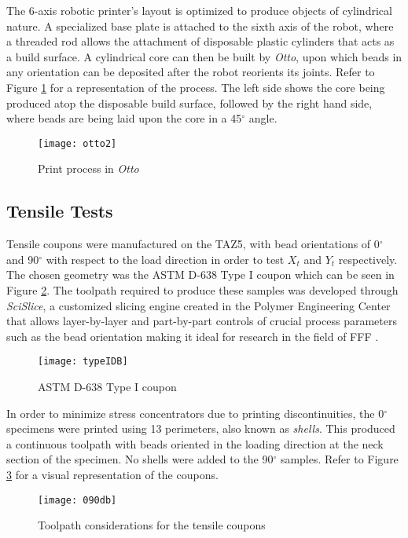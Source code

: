 \documentclass[main.tex]{subfiles}
\begin{document}
The 6-axis robotic printer's layout is optimized to produce objects of cylindrical nature. A specialized base plate is attached to the sixth axis of the robot, where a threaded rod allows the attachment of disposable plastic cylinders that acts as a build surface. A cylindrical core can then be built by \emph{Otto}, upon which beads in any orientation can be deposited after the robot reorients its joints. Refer to Figure \ref{fig:otto2} for a representation of the process. The left side shows the core being produced atop the disposable build surface, followed by the right hand side, where beads are being laid upon the core in a 45$^\circ$ angle.  
\begin{figure}[h]
	\center
	\texttt{[image: otto2]}
	\caption{Print process in \emph{Otto}} \label{fig:otto2}
\end{figure}

\subsection{Tensile Tests}
Tensile coupons were manufactured on the TAZ5, with bead orientations of 0$^\circ$ and 90$^\circ$ with respect to the load direction in order to test $X_t$ and $Y_t$ respectively. The chosen geometry was the ASTM D-638 Type I coupon \cite{ASTMD638} which can be seen in Figure \ref{fig:db}. The toolpath required to produce these samples was developed through \emph{SciSlice}, a customized slicing engine created in the Polymer Engineering Center that allows layer-by-layer and part-by-part controls of crucial process parameters \textemdash such as the bead orientation \textemdash making it ideal for research in the field of FFF \cite{VanHulle2017a}.

\begin{figure}[h]
	\center
	\texttt{[image: typeIDB]}
	\caption{ASTM D-638 Type I coupon} \label{fig:db}
\end{figure}

In order to minimize stress concentrators due to printing discontinuities, the 0$^\circ$ specimens were printed using 13 perimeters, also known as \emph {shells}. This produced a continuous toolpath with beads oriented in the loading direction at the neck section of the specimen. No shells were added to the 90$^\circ$ samples. Refer to Figure \ref{fig:090db} for a visual representation of the coupons. 

\begin{figure}[h]
	\center
	\texttt{[image: 090db]}
	\caption{Toolpath considerations for the tensile coupons} \label{fig:090db}
\end{figure}
\end{document}
